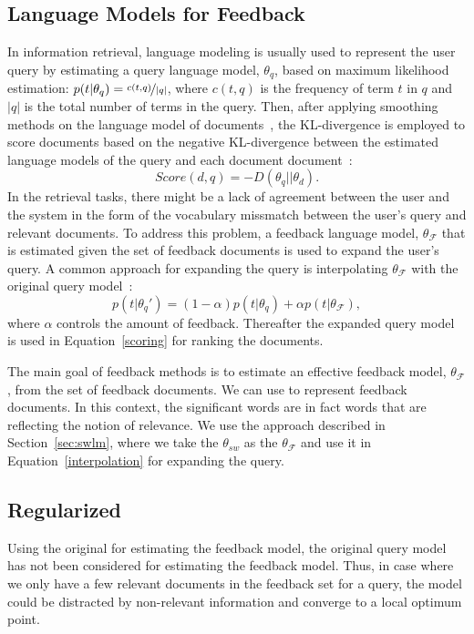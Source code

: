 \subsection{Language Models for Feedback}
In information retrieval, language modeling is usually used to represent the user query by estimating a query language model, $\theta_q$, based on maximum likelihood estimation:
$p(t|\theta_q)=\nicefrac{c(t,q)}{|q|}$, 
where $c(t,q)$ is the frequency of term $t$ in $q$ and $|q|$ is the total number of terms in the query.
Then, after applying smoothing methods on the language model of documents~\citep{Zhai:2001}, the KL-divergence is employed to score documents based on the negative KL-divergence between the estimated language models of the query and each document document~\citep{Lafferty:2001}:
\begin{equation}
Score(d,q) = -D(\theta_q||\theta_d).
\label{scoring}
\end{equation}
In the retrieval tasks, there might be a lack of agreement between the user and the system in the form of the vocabulary missmatch between the user's query and relevant documents. To address this problem, a feedback language model, $\theta_\mathcal{F}$ that is estimated given the set of feedback documents is used to expand the user's query. 
A common approach for expanding the query is interpolating $\theta_\mathcal{F}$ with the original query model~\cite{Zhai:SMM:2001,Abdul-jaleel:2004}:
\begin{equation}
p(t|\theta_{q}') = (1-\alpha)p(t|\theta_q)+\alpha p(t|\theta_\mathcal{F}),
\label{interpolation}
\end{equation}
where $\alpha$ controls the amount of feedback. Thereafter the expanded query model is used in Equation~\ref{scoring} for ranking the documents.

The main goal of feedback methods is to estimate an effective feedback model, $\theta_\mathcal{F}$, from the set of feedback documents. 
We can use \swlms to represent feedback documents. In this context, the significant words are in fact words that are reflecting the notion of relevance. We use the approach described in Section~\ref{sec:swlm}, where we take the $\theta_{sw}$ as the $\theta_\mathcal{F}$  and use it in Equation~\ref{interpolation} for expanding the query. 


\subsection{Regularized \acswlm}
Using the original \swlms for estimating the feedback model, the original query model has not been considered for estimating the feedback model. Thus, in case where we only have a few relevant documents in the feedback set for a query, the model could be distracted by non-relevant information and converge to a local optimum point.

